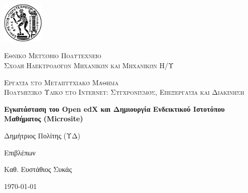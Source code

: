 \documentclass[12pt]{report}
\newcommand\blankpage{%
    \null
    \thispagestyle{empty}%
    \addtocounter{page}{-1}%
    \newpage}
\begin{document}

\hypersetup{pageanchor=false}

\begin{titlepage}
  \centering
  \includegraphics[width=0.15\textwidth]{pyrforos}\par\vspace{1cm}
  {\scshape\LARGE Εθνικό Μετσόβιο Πολυτεχνείο\\
  Σχολή Ηλεκτρολόγων Μηχανικών και Μηχανικών Η/Υ\par}
  \vspace{1cm}
  {\scshape\Large Εργασία στο Μεταπτυχιακό Μάθημα\\
  Πολυμεσικό Υλικό στο Internet: Συγχρονισμός, Επεξεργασία και Διακίνηση\par}
  \vspace{1.5cm}
  {\Large\bfseries Εγκατάσταση του \textlatin{Open edX} και Δημιουργία Ενδεικτικού Ιστοτόπου Μαθήματος (\textlatin{Microsite})\par}
  \vspace{2cm}
  {\large Δημήτριος Πολίτης (ΥΔ)\par}
  \vfill
  Επιβλέπων \par
  Καθ. Ευστάθιος Συκάς

  \vfill

  {\large \today\par}
  \afterpage{\blankpage}
\end{titlepage}

\tableofcontents
\thispagestyle{empty}

\listoffigures
\thispagestyle{empty}

\begin{abstract}
Στο παρόν παρουσιάζεται η λειτουργία και η διαδικασία ανάπτυξης ενός μαθήματος στην πλατφόρμα \textlatin{Open-EDX}. Αρχικά  γίνεται αναφορά στην εν λόγω πλατφόρμα ηλεκτρονικής μάθησης και στη συνέχεια περιγράφεται αναλυτικά η διαδικασία εγκατάστασης της, με τη χρήση αυτοματοποιημένων εργαλείων (\textlatin{ansible, vagrant}). Τέλος περιγράφεται ο τρόπος δημιουργίας εντός τής πλατφόρμας, ενός ενδεικτικού ιστοτόπου μαθήματος. Η εργασία είναι διαθέσιμη από το σύνδεσμο \textlatin{\url{https://github.com/dpolitis/open-edx-install}}.

\vspace{10mm}

\noindent \textbf{Λέξεις κλειδιά:} Ηλεκτρονική Μάθηση, Ανοιχτός Κώδικας, Διαδίκτυο.
\end{abstract}
\end{document}

